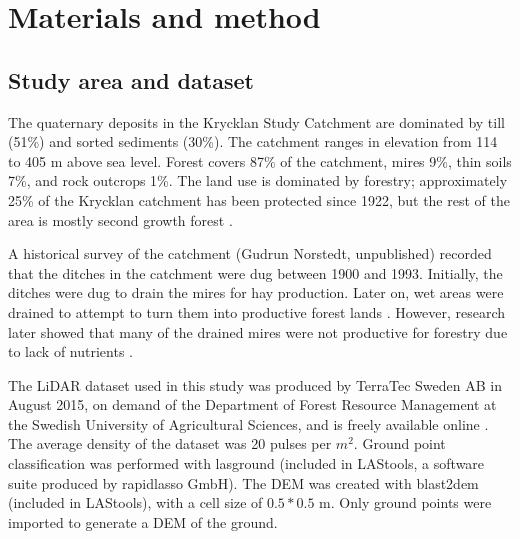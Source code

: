 \documentclass[11pt, review]{elsarticle} %
\begin{document}
\section{Materials and method}
\label{method}

\subsection{Study area and dataset}
The quaternary deposits in the Krycklan Study Catchment are dominated by till (51\%) and sorted sediments (30\%). The catchment ranges in elevation from 114 to 405 m above sea level. Forest covers 87\% of the catchment, mires 9\%, thin soils 7\%, and rock outcrops 1\%. The land use is dominated by forestry; approximately 25\% of the Krycklan catchment has been protected since 1922, but  the rest of the area is mostly second growth forest \citep{krycklancatchment}. 

A historical survey of the catchment (Gudrun Norstedt, unpublished) recorded  that the ditches in the catchment were dug between 1900 and 1993. Initially, the ditches were dug to drain the mires for hay production. Later on, wet areas were drained to attempt to turn them into productive forest lands \citep{paivanen}. However, research later showed that many of the drained mires were not productive for forestry due to lack of nutrients \citep{sikstrom}.

The LiDAR dataset used in this study was produced by TerraTec Sweden AB in August 2015, on demand of the Department of Forest Resource Management at the Swedish University of Agricultural Sciences, and is freely available online \citep{dataset}. The average density of the dataset was 20 pulses per $m^2$. Ground point classification was performed with lasground (included in LAStools, a software suite produced by rapidlasso GmbH). The DEM was created with blast2dem (included in LAStools), with a cell size of $0.5*0.5$ m. Only ground points were imported to generate a DEM of the ground.
\end{document}
